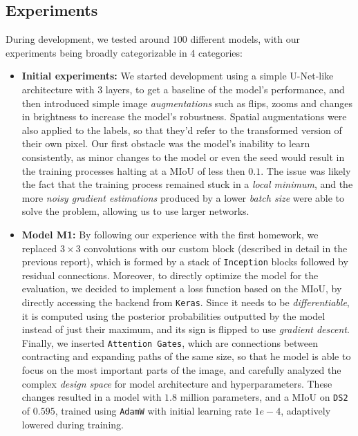 \documentclass[11pt]{article}
\begin{document}
\begin{multicols}{2}
      \section{Experiments}
      \label{sec:experiments}
      During development, we tested around $100$ different models, with our experiments being broadly categorizable in 4 categories:
      \begin{itemize}[leftmargin=*]
            \setlength\itemsep{0em}
            \item \textbf{Initial experiments:} We started development using a simple U-Net-like architecture with 3 layers, to get a baseline of the model's performance, and then introduced simple image \textit{augmentations} such as flips, zooms and changes in brightness to increase the model's robustness. Spatial augmentations were also applied to the labels, so that they'd refer to the transformed version of their own pixel. Our first obstacle was the model's inability to learn consistently, as minor changes to the model or even the seed would result in the training processes halting at a MIoU of less then $0.1$. The issue was likely the fact that the training process remained stuck in a \textit{local minimum}, and the more \textit{noisy gradient estimations} produced by a lower \textit{batch size} were able to solve the problem, allowing us to use larger networks.
            \item \textbf{Model M1:} By following our experience with the first homework, we replaced $3\times3$ convolutions with our custom block (described in detail in the previous report), which is formed by a stack of \texttt{Inception} blocks followed by residual connections. Moreover, to directly optimize the model for the evaluation, we decided to implement a loss function based on the MIoU, by directly accessing the backend from \texttt{Keras}. Since it needs to be \textit{differentiable}, it is computed using the posterior probabilities outputted by the model instead of just their maximum, and its sign is flipped to use \textit{gradient descent}. Finally, we inserted \texttt{Attention Gates}\cite{oktay2018attentionunetlearninglook}, which are connections between contracting and expanding paths of the same size, so that he model is able to focus on the most important parts of the image, and carefully analyzed the complex \textit{design space} for model architecture and hyperparameters. These changes resulted in a model with $1.8$ million parameters, and a MIoU on \texttt{DS2} of $0.595$, trained using \texttt{AdamW} with initial learning rate $1e-4$, adaptively lowered during training.

\end{itemize}
\end{multicols}
\end{document}
